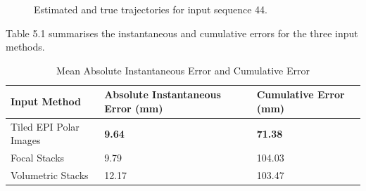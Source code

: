 \begin{figure}[H]
    \caption{Estimated and true trajectories for input sequence 44.}
    \setcounter{subfigure}{0}
\end{figure}

Table 5.1 summarises the instantaneous and cumulative errors for the three input methods. 
 
\begin{table}[htbp]
    \caption{Mean Absolute Instantaneous Error and Cumulative Error}
    \centering
    \begin{tabular}{@{}lll@{}}
        \toprule
        Input Method        & Absolute Instantaneous Error (mm)   & Cumulative Error (mm) \\
        \midrule 
        Tiled EPI Polar Images & \textbf{9.64} & \textbf{71.38} \\
        Focal Stacks & 9.79 & 104.03 \\
        Volumetric Stacks & 12.17 & 103.47 \\
        \bottomrule
        
    \end{tabular}
\end{table}


